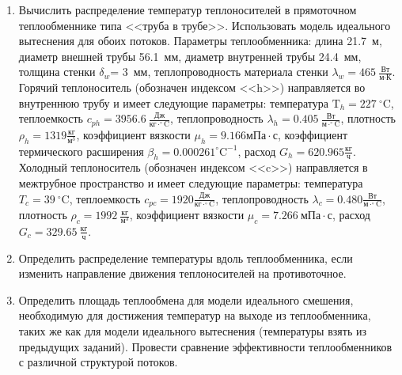 \begin{enumerate} 
\item Вычислить распределение температур теплоносителей в прямоточном теплообменнике типа <<труба в трубе>>. Использовать модель идеального вытеснения для обоих потоков. Параметры теплообменника: длина  21.7~м, диаметр внешней трубы 56.1~мм,  диаметр внутренней трубы 24.4~мм, толщина стенки $\delta_{w}$=     3~мм,  теплопроводность материала стенки $\lambda_{w}=  465~\frac{\text{Вт}}{\text{м} \cdot \text{К}}$.  Горячий теплоноситель (обозначен индексом <<h>>) направляется во внутреннюю трубу и	 имеет следующие параметры: температура $\text{T}_{h}= 227~^\circ\mathrm{C}$, теплоемкость	  $c_{p{h}}= 3956.6~\frac{\text{Дж}}{\text{кг} \cdot ^\circ\mathrm{C}}$, теплопроводность 		$\lambda_{h}= 0.405~\frac{\text{Вт}}{\text{м} \cdot ^\circ\mathrm{C}}$, плотность 		$\rho_{h}= 1319 \frac{\text{кг}}{\text{м}^3}$, коэффициент вязкости $\mu_{h}=9.166 \text{мПа} 		\cdot \text{с} $, коэффициент термического расширения $\beta_{h}=0.000261 ^\circ\mathrm{C}^{-1}$,		 расход $G_{h}= 620.965 \frac{\text{кг}}{\text{ч}}$. Холодный теплоноситель (обозначен индексом <<c>>) 		 направляется в межтрубное пространство и имеет следующие параметры: температура $T_{c}=   39		 ~^\circ\mathrm{C}$, теплоемкость $c_{p{c}}= 1920 \frac{\text{Дж}}{\text{кг} \cdot ^\circ\mathrm{C}}$,			 теплопроводность $\lambda_{c}=0.480 \frac{\text{Вт}}{\text{м} \cdot ^\circ\mathrm{C}}$, плотность 			 $\rho_{c}=  1992~\frac{\text{кг}}{\text{м}^3}$, коэффициент вязкости $\mu_{c}=7.266~\text{мПа} \cdot \text{с} $, 			 расход $G_{c}=329.65~\frac{\text{кг}}{\text{ч}}$. 

\item Определить распределение температуры вдоль теплообменника, если 	изменить направление движения теплоносителей на противоточное.

\item Определить площадь теплообмена для модели идеального смешения, необходимую для достижения 	температур на выходе из теплообменника, таких же как для модели идеального вытеснения (температуры взять из предыдущих заданий).	Провести сравнение эффективности теплообменников с различной структурой потоков.

\end{enumerate}

